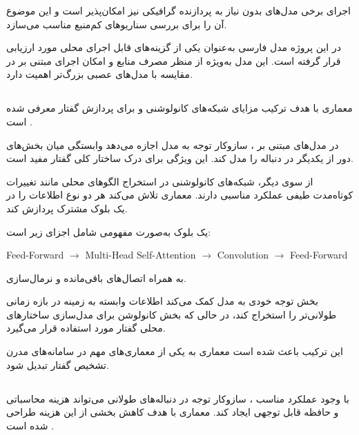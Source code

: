 اجرای برخی مدل‌های  بدون نیاز به پردازنده گرافیکی
نیز امکان‌پذیر است و این موضوع آن را برای بررسی سناریوهای
کم‌منبع مناسب می‌سازد.

در این پروژه مدل فارسی
به‌عنوان یکی از گزینه‌های قابل اجرای محلی مورد ارزیابی قرار
گرفته است.
این مدل به‌ویژه از منظر مصرف منابع و امکان اجرای مبتنی بر
در مقایسه با مدل‌های عصبی بزرگ‌تر اهمیت دارد.


\subsection{}

معماری
با هدف ترکیب مزایای شبکه‌های کانولوشنی و
برای پردازش گفتار معرفی شده است
\cite{gulati2020conformer}.

در مدل‌های مبتنی بر ،
سازوکار توجه به مدل اجازه می‌دهد وابستگی میان بخش‌های دور
از یکدیگر در دنباله را مدل کند.
این ویژگی برای درک ساختار کلی گفتار مفید است.

از سوی دیگر، شبکه‌های کانولوشنی در استخراج الگوهای محلی
مانند تغییرات کوتاه‌مدت طیفی عملکرد مناسبی دارند.
معماری  تلاش می‌کند هر دو نوع اطلاعات را در
یک بلوک مشترک پردازش کند.

یک بلوک  به‌صورت مفهومی شامل اجزای زیر است:

\begin{center}
Feed-Forward
$\rightarrow$
Multi-Head Self-Attention
$\rightarrow$
Convolution
$\rightarrow$
Feed-Forward
\end{center}

به همراه اتصال‌های باقی‌مانده
و نرمال‌سازی.

بخش توجه خودی
به مدل کمک می‌کند اطلاعات وابسته به زمینه در بازه زمانی
طولانی‌تر را استخراج کند، در حالی که بخش کانولوشن برای
مدل‌سازی ساختارهای محلی گفتار مورد استفاده قرار می‌گیرد.

این ترکیب باعث شده است معماری  به یکی از
معماری‌های مهم در سامانه‌های مدرن تشخیص گفتار تبدیل شود.


\subsection{}

با وجود عملکرد مناسب ، سازوکار توجه در دنباله‌های
طولانی می‌تواند هزینه محاسباتی و حافظه قابل توجهی ایجاد کند.
معماری
با هدف کاهش بخشی از این هزینه طراحی شده است
\cite{rekesh2023fastconformer}.

